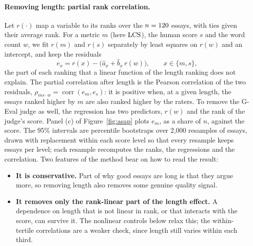 \paragraph{Removing length: partial rank correlation.} Let $r(\cdot)$ map a variable to its ranks
over the $n=120$ essays, with ties given their average rank. For a metric $m$ (here $\mathrm{LCS}$),
the human score $s$ and the word count $w$, we fit $r(m)$ and $r(s)$ separately by least squares on
$r(w)$ and an intercept, and keep the residuals
\[
  e_x = r(x) - \bigl(\hat a_x + \hat b_x\, r(w)\bigr), \qquad x\in\{m,s\},
\]
the part of each ranking that a linear function of the length ranking does not explain. The
partial correlation after length is the Pearson correlation of the two residuals,
$\rho_{ms\cdot w}=\operatorname{corr}(e_m,e_s)$: it is positive when, at a given length, the
essays ranked higher by $m$ are also ranked higher by the raters. To remove the G-Eval judge as
well, the regression has two predictors, $r(w)$ and the rank of the judge's score. Panel (c) of
Figure~\ref{fig:asap} plots $e_m$, as a share of $n$, against the score. The 95\% intervals are
percentile bootstraps over 2{,}000 resamples of essays, drawn with replacement within each score
level so that every resample keeps \asapPerLevel{} essays per level; each resample recomputes the
ranks, the regressions and the correlation. Two features of the method bear on how to read the
result:
\begin{itemize}[leftmargin=1.2em,itemsep=1pt,topsep=2pt]
\item \textbf{It is conservative.} Part of why good essays are long is that they argue more, so
  removing length also removes some genuine quality signal.
\item \textbf{It removes only the rank-linear part of the length effect.} A dependence on length
  that is not linear in rank, or that interacts with the score, can survive it. The nonlinear
  controls below relax this; the within-tertile correlations are a weaker check, since length still
  varies within each third.
\end{itemize}

